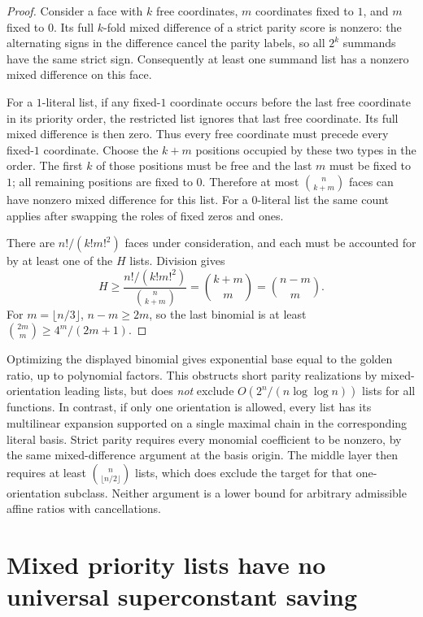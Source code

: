 \documentclass[11pt]{article}
\begin{document}
\begin{proof}
Consider a face with $k$ free coordinates, $m$ coordinates fixed to $1$,
and $m$ fixed to $0$. Its full $k$-fold mixed difference of a strict
parity score is nonzero: the alternating signs in the difference cancel
the parity labels, so all $2^k$ summands have the same strict sign.
Consequently at least one summand list has a nonzero mixed difference
on this face.

For a $1$-literal list, if any fixed-$1$ coordinate occurs before the
last free coordinate in its priority order, the restricted list ignores
that last free coordinate. Its full mixed difference is then zero.
Thus every free coordinate must precede every fixed-$1$ coordinate.
Choose the $k+m$ positions occupied by these two types in the order.
The first $k$ of those positions must be free and the last $m$ must be
fixed to $1$; all remaining positions are fixed to $0$. Therefore at
most $\binom n{k+m}$ faces can have nonzero mixed difference for this
list. For a $0$-literal list the same count applies after swapping the
roles of fixed zeros and ones.

There are $n!/(k!m!^2)$ faces under consideration, and each must be
accounted for by at least one of the $H$ lists. Division gives
\[
 H\geq\frac{n!/(k!m!^2)}{\binom n{k+m}}
       =\binom{k+m}{m}=\binom{n-m}{m}.
\]
For $m=\lfloor n/3\rfloor$, $n-m\geq2m$, so the last binomial is at
least $\binom{2m}{m}\geq4^m/(2m+1)$.
\end{proof}

Optimizing the displayed binomial gives exponential base equal to the
golden ratio, up to polynomial factors. This obstructs short parity
realizations by mixed-orientation leading lists, but does \emph{not}
exclude $O(2^n/(n\log\log n))$ lists for all functions. In contrast,
if only one orientation is allowed, every list has its multilinear
expansion supported on a single maximal chain in the corresponding
literal basis. Strict parity requires every monomial coefficient to be
nonzero, by the same mixed-difference argument at the basis origin.
The middle layer then requires at least
$\binom n{\lfloor n/2\rfloor}$ lists, which does exclude the target
for that one-orientation subclass. Neither argument is a lower bound
for arbitrary admissible affine ratios with cancellations.

\section{Mixed priority lists have no universal superconstant saving}
\end{document}
